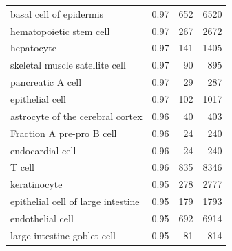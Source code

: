 \begin{table}[pht!]
\begin{tabular}{lrrr}
  basal cell of epidermis & 0.97 & 652 & 6520 \\ 
  hematopoietic stem cell & 0.97 & 267 & 2672 \\ 
  hepatocyte & 0.97 & 141 & 1405 \\ 
  skeletal muscle satellite cell & 0.97 &  90 & 895 \\ 
  pancreatic A cell & 0.97 &  29 & 287 \\ 
  epithelial cell & 0.97 & 102 & 1017 \\ 
  astrocyte of the cerebral cortex & 0.96 &  40 & 403 \\ 
  Fraction A pre-pro B cell & 0.96 &  24 & 240 \\ 
  endocardial cell & 0.96 &  24 & 240 \\ 
  T cell & 0.96 & 835 & 8346 \\ 
  keratinocyte & 0.95 & 278 & 2777 \\ 
  epithelial cell of large intestine & 0.95 & 179 & 1793 \\ 
  endothelial cell & 0.95 & 692 & 6914 \\ 
  large intestine goblet cell & 0.95 &  81 & 814 \\ 
   \bottomrule
\end{tabular}
\end{table}


